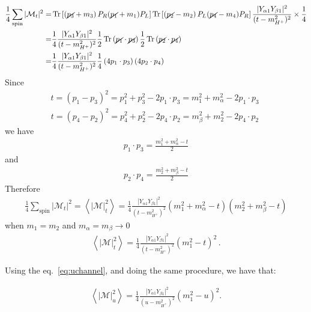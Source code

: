 \documentclass[12pt,letterpaper]{article}
\begin{document}
\begin{align*}
  \frac{1}{4}\sum_{\text{spin}} |\mathcal{M}_{t}|^2=&
\operatorname{Tr}\left[ \left( \cancel{p_3}+m_3 \right)P_R (\cancel{p_1}+m_1)P_L \right]
\operatorname{Tr}\left[ \left( \cancel{p_2}-m_2 \right)P_L (\cancel{p_4}-m_4)P_R \right]
\frac{|Y_{\alpha 1} Y_{\beta 1}|^2}{(t-m_{H^+}^2)^2}\times \frac{1}{4}\\
=&\frac{1}{4}\frac{|Y_{\alpha 1} Y_{\beta 1}|^2}{(t-m_{H^+}^2)^2}
\frac{1}{2}\operatorname{Tr}\left( \cancel{p_1}\cdot\cancel{p_3} \right)
\frac{1}{2}\operatorname{Tr}\left( \cancel{p_2}\cdot\cancel{p_4} \right)\\
=&\frac{1}{4}\frac{|Y_{\alpha 1} Y_{\beta 1}|^2}{(t-m_{H^+}^2)^2}
\frac{1}{4}\left(4 p_1\cdot p_3  \right)\left(4 p_2\cdot p_4  \right)
\end{align*}
Since
\begin{align*}
 t=(p_1-p_3)^2=p_1^2+p_3^2-2p_1\cdot p_3=
m_1^2+m_{\alpha}^2-2p_1\cdot p_3 \;
\end{align*}
\begin{align*}
 t=(p_4-p_2)^2=p_4^2+p_2^2-2p_4\cdot p_2=
m_{\beta}^2+m_2^2-2p_4\cdot p_2 \;
\end{align*}
we have
\begin{align*}
  p_1\cdot p_3=\frac{m_1^2+m_{\alpha}^2-t}{2}
\end{align*}
and 
\begin{align*}
  p_2\cdot p_4=\frac{m_2^2+m_{\beta}^2-t}{2}
\end{align*}
Therefore
\begin{align*}
   \frac{1}{4}\sum_{\text{spin}} |\mathcal{M}_{t}|^2= \left\langle |\mathcal{M}|_t^2 \right\rangle
=\frac{1}{4}\frac{|Y_{\alpha 1} Y_{\beta 1}|^2}{(t-m_{H^+}^2)^2}\left( m_1^2+m_{\alpha}^2-t \right)
\left( m_2^2+m_{\beta}^2-t \right)
\end{align*}
when $m_1=m_2$ and $m_{\alpha}=m_{\beta}\to 0$
\begin{align}
\label{eq:mt2}
  \left\langle |\mathcal{M}|_t^2 \right\rangle
=\frac{1}{4}\frac{|Y_{\alpha 1} Y_{\beta 1}|^2}{(t-m_{H^+}^2)^2}\left( m_1^2-t \right)^2\,.
\end{align}

Using the eq.~\eqref{eq:uchannel}, and doing the same procedure, we have that:


\begin{align}
\label{eq:mu2}
  \left\langle |\mathcal{M}|_u^2 \right\rangle
=\frac{1}{4}\frac{|Y_{\alpha 1} Y_{\beta 1}|^2}{(u-m_{H^+}^2)^2}\left( m_1^2-u \right)^2 .
\end{align}
\end{document}
